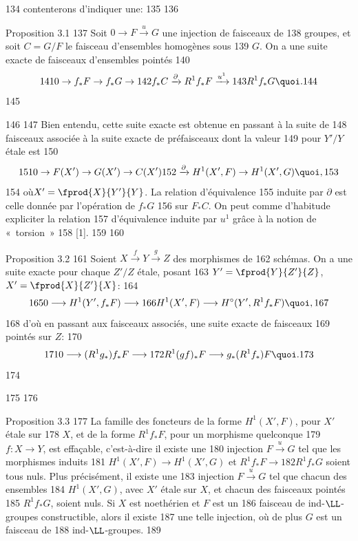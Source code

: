    134	contenterons d'indiquer une:
   135	
   136	\begin{enonce*}{Proposition 3.1}
   137	Soit $0\rightarrow F\xrightarrow{u} G$ une injection de faisceaux de
   138	groupes, et soit $C=G/F$ le faisceau d'ensembles homogènes sous
   139	$G$. On a une suite exacte de faisceaux d'ensembles pointés
   140	$$
   141	0\rightarrow f_{\ast}F\rightarrow f_{\ast}G\rightarrow
   142	f_{\ast}C\xrightarrow{\partial} R^1f_{\ast}F\xrightarrow{u^1}
   143	R^1f_{\ast}G{\quoi}.
   144	$$
   145	\end{enonce*}
   146	
   147	Bien entendu, cette suite exacte est obtenue en passant à la suite de
   148	faisceaux associée à la suite exacte de préfaisceaux dont la valeur
   149	pour $Y'/Y$ étale est
   150	$$
   151	0\rightarrow F(X')\rightarrow G(X')\rightarrow C(X')
   152	\xrightarrow{\partial} H^1(X',F)\rightarrow H^1(X',G){\quoi},
   153	$$
   154	où\pageoriginale $X'=\fprod{X}{Y'}{Y}$. La relation d'équivalence
   155	induite par $\partial$ est celle donnée par l'opération de $f_{\ast}G$
   156	sur $F_{\ast}C$. On peut comme d'habitude expliciter la relation
   157	d'équivalence induite par $u^1$ grâce à la notion de « torsion » 
   158	[1].
   159	
   160	\begin{enonce*}{Proposition 3.2}
   161	Soient $X\xrightarrow{f}Y\xrightarrow{g}Z$ des morphismes de
   162	schémas. On a une suite exacte pour chaque $Z'/Z$ étale, posant
   163	$Y'=\fprod{Y}{Z'}{Z}$, $X'=\fprod{X}{Z'}{X}$:
   164	$$
   165	0\longrightarrow H^1(Y',f_{\ast}F)\longrightarrow
   166	H^1(X',F)\longrightarrow H^{\circ}(Y',R^1f_{\ast}F){\quoi},
   167	$$
   168	d'où en passant aux faisceaux associés, une suite exacte de faisceaux
   169	pointés sur $Z$:
   170	$$
   171	0\longrightarrow (R^1g_{\ast})f_{\ast}F\longrightarrow
   172	R^1(gf)_{\ast}F\longrightarrow g_{\ast}(R^1f_{\ast})F{\quoi}.
   173	$$
   174	\end{enonce*}
   175	
   176	\begin{enonce*}{Proposition 3.3}
   177	La famille des foncteurs de la forme $H^1(X',F)$, pour $X'$ étale sur
   178	$X$, et de la forme $R^1f_{\ast}F$, pour un morphisme quelconque
   179	$f:X\rightarrow Y$, est effaçable, c'est-à-dire il existe une
   180	injection $F\xrightarrow{u}G$ tel que les morphismes induits
   181	$H^1(X',F)\rightarrow H^1(X',G)$ et $R^1f_{\ast}F\rightarrow
   182	R^1f_{\ast}G$ soient tous nuls. Plus précisément, il existe une
   183	injection $F\xrightarrow{u}G$ tel que chacun des ensembles
   184	$H^1(X',G)$, avec $X'$ étale sur $X$, et chacun des faisceaux pointés
   185	$R^1f_{\ast}G$, soient nuls. Si $X$ est noethérien et $F$ est un
   186	faisceau de ind-$\LL$-groupes constructible, alors il existe
   187	une telle injection, où de plus $G$ est un faisceau de
   188	ind-$\LL$-groupes.
   189	\end{enonce*}
